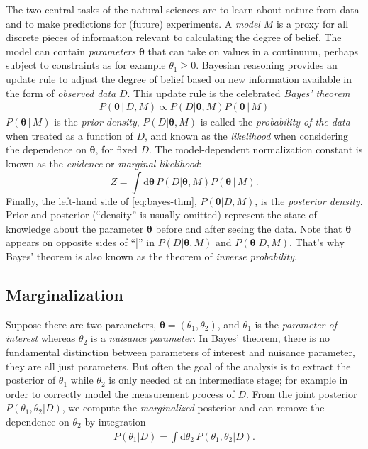\documentclass[
11pt,
a4paper,
bibliography=totoc,
captions=nooneline, %
numbers=noenddot,
twoside]{scrbook}
\newcommand{\cond}{\,|\,}
\newcommand\rmdx[1]{\mbox{d}#1\,} %
\newcommand{\scath}{\theta} %
\newcommand{\vecth}{\bm{\theta}} %
\begin{document}
The two central tasks of the natural sciences are to learn about
nature from data and to make predictions for (future) experiments. A
\emph{model} $M$ is a proxy for all discrete pieces of information relevant
to calculating the degree of belief. The model can contain \emph{parameters}
$\vecth$ that can take on values in a continuum, perhaps subject to
constraints as for example $\scath_1 \geq 0$. Bayesian reasoning
provides an update rule to adjust the degree of belief based on new
information available in the form of \emph{observed data} $D$. This update
rule is the celebrated \emph{Bayes' theorem}
\begin{align}
  \label{eq:bayes-thm}
  \boxed{  P(\vecth \cond D, M) \propto P(D|\vecth, M) P(\vecth \cond M)
  }
\end{align}
$P(\vecth \cond M)$ is the \emph{prior density}, $P(D|\vecth, M)$ is
called the \emph{probability of the data} when treated as a function
of $D$, and known as the \emph{likelihood} when considering the
dependence on $\vecth$, for fixed $D$. The model-dependent
normalization constant is known as the \emph{evidence} or
\emph{marginal likelihood}:
\begin{equation}
  \label{eq:evidence}
  Z = \int \rmdx{ \vecth} P(D|\vecth, M) P(\vecth \cond M).
\end{equation}
Finally, the left-hand side of \eqref{eq:bayes-thm}, $P(\vecth | D,
M)$, is the \emph{posterior density}. Prior and posterior (``density''
is usually omitted) represent the state of knowledge about the
parameter $\vecth$ before and after seeing the data. Note that
$\vecth$ appears on opposite sides of ``|'' in $P(D|\vecth,M)$ and
$P(\vecth|D,M)$. That's why Bayes' theorem is also known as the
theorem of \emph{inverse probability}.

\subsection{Marginalization} \label{sec:marginalization}

Suppose there are two parameters, $\vecth = (\scath_1, \scath_2)$, and
$\scath_1$ is the \emph{parameter of interest} whereas $\scath_2$ is a
\emph{nuisance parameter}. In Bayes' theorem, there is no fundamental
distinction between parameters of interest and nuisance parameter,
they are all just parameters. But often the goal of the analysis is to
extract the posterior of $\scath_1$ while $\scath_2$ is only needed at
an intermediate stage; for example in order to correctly model the
measurement process of $D$. From the joint posterior $P(\scath_1,
\scath_2 | D)$, we compute the \emph{marginalized} posterior and can
remove the dependence on $\scath_2$ by integration
\begin{align}
  \label{eq:marginal}
  P(\scath_1 | D) = \int \rmdx{\scath_2} P(\scath_1, \scath_2 | D).
\end{align}
\end{document}
